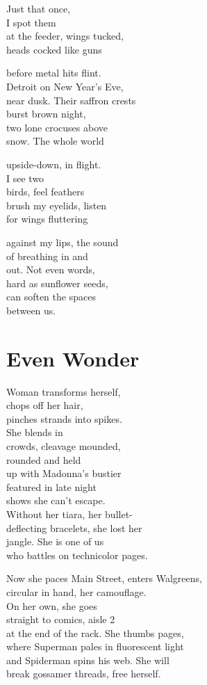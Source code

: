 \documentclass[twoside,10pt]{book}
\begin{document}
Just that once,\\
I spot them\\
at the feeder, wings tucked,\\
heads cocked like guns

before metal hits flint.\\
Detroit on New Year's Eve,\\
near dusk. Their saffron crests\\
burst brown night,\\
two lone crocuses above\\
snow. The whole world

upside-down, in flight.\\
I see two\\
birds, feel feathers\\
brush my eyelids, listen\\
for wings fluttering

against my lips, the sound\\
of breathing in and\\
out. Not even words,\\
hard as sunflower seeds,\\
can soften the spaces\\
between us.


\clearpage
\section{Even Wonder}

Woman transforms herself,\\
chops off her hair,\\
pinches strands into spikes.\\
She blends in\\
crowds, cleavage mounded,\\
rounded and held\\
up with Madonna's bustier\\
featured in late night\\
shows she can't escape.\\
Without her tiara, her bullet-\\
deflecting bracelets, she lost her\\
jangle. She is one of us\\
who battles on technicolor pages.

Now she paces Main Street, enters Walgreens,\\
circular in hand, her camouflage.\\
On her own, she goes\\
straight to comics, aisle 2\\
at the end of the rack. She thumbs pages,\\
where Superman pales in fluorescent light\\
and Spiderman spins his web. She will\\
break gossamer threads, free herself.
\end{document}
